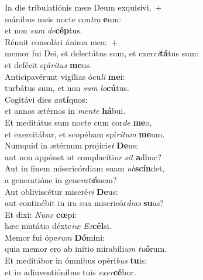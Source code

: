 \evenverse In die tribulatiónis meæ Deum exquisívi,~+\\\evenverse  mánibus meis nocte con\textit{tra} \textbf{e}um:~\*\\
\evenverse et non \textit{sum} \textit{de}\textbf{cép}tus.\\
\oddverse Rénuit consolári ánima mea:~+\\
\oddverse  memor fui Dei, et delectátus sum, et exer\textit{ci}\textbf{tá}tus sum:~\*\\
\oddverse et defécit spí\textit{ri}\textit{tus} \textbf{me}us.\\
\evenverse Anticipavérunt vigílias ócu\textit{li} \textbf{me}i:~\*\\
\evenverse turbátus sum, et non \textit{sum} \textit{lo}\textbf{cú}tus.\\
\oddverse Cogitávi dies \textit{an}\textbf{tí}quos:~\*\\
\oddverse et annos ætérnos in \textit{men}\textit{te} \textbf{há}bui.\\
\evenverse Et meditátus sum nocte cum cor\textit{de} \textbf{me}o,~\*\\
\evenverse et exercitábar, et scopébam spí\textit{ri}\textit{tum} \textbf{me}um.\\
\oddverse Numquid in ætérnum projíci\textit{et} \textbf{De}us:~\*\\
\oddverse aut non appónet ut complacíti\textit{or} \textit{sit} \textbf{a}dhuc?\\
\evenverse Aut in finem misericórdiam suam \textit{ab}\textbf{scín}det,~\*\\
\evenverse a generatióne in gene\textit{ra}\textit{ti}\textbf{ó}nem?\\
\oddverse Aut obliviscétur miseré\textit{ri} \textbf{De}us:~\*\\
\oddverse aut continébit in ira sua misericór\textit{di}\textit{as} \textbf{su}as?\\
\evenverse Et dixi: \textit{Nunc} \textbf{cœ}pi:~\*\\
\evenverse hæc mutátio déxte\textit{ræ} \textit{Ex}\textbf{cél}si.\\
\oddverse Memor fui ópe\textit{rum} \textbf{Dó}mini:~\*\\
\oddverse quia memor ero ab inítio mirabíli\textit{um} \textit{tu}\textbf{ó}rum.\\
\evenverse Et meditábor in ómnibus opéri\textit{bus} \textbf{tu}is:~\*\\
\evenverse et in adinventiónibus tuis \textit{e}\textit{xer}\textbf{cé}bor.\\

